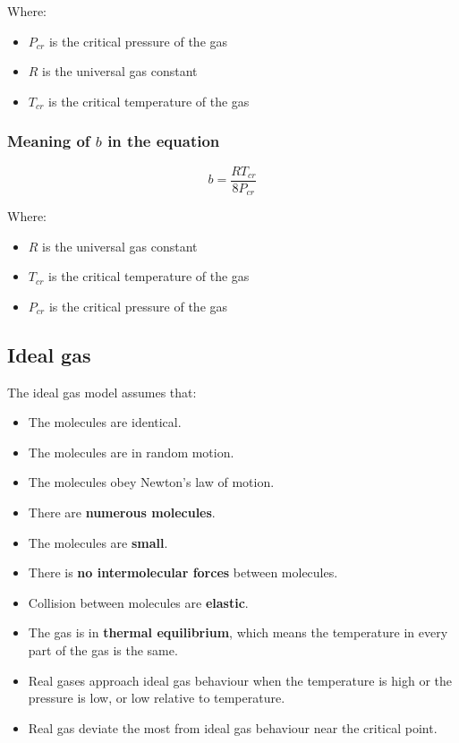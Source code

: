 \documentclass[11pt]{article}
\begin{document}
Where:
\begin{itemize}
\item \(P_{cr}\) is the critical pressure of the gas
\item \(R\) is the universal gas constant
\item \(T_{cr}\) is the critical temperature of the gas
\end{itemize}

\subsubsection{Meaning of \(b\) in the equation}
\label{sec:orgd60b860}
\[b = \frac{RT_{cr}}{8 P_{cr}}\]

Where:
\begin{itemize}
\item \(R\) is the universal gas constant
\item \(T_{cr}\) is the critical temperature of the gas
\item \(P_{cr}\) is the critical pressure of the gas
\end{itemize}

\subsection{Ideal gas}
\label{sec:org60fb6e7}
The ideal gas model assumes that:
\begin{itemize}
\item The molecules are identical.
\item The molecules are in random motion.
\item The molecules obey Newton's law of motion.
\item There are \textbf{numerous molecules}.
\item The molecules are \textbf{small}.
\item There is \textbf{no intermolecular forces} between molecules.
\item Collision between molecules are \textbf{elastic}.
\item The gas is in \textbf{thermal equilibrium}, which means the temperature in every part of the gas is the same.
\item Real gases approach ideal gas behaviour when the temperature is high or the pressure is low, or low relative to temperature.
\item Real gas deviate the most from ideal gas behaviour near the critical point.
\end{itemize}
\end{document}
